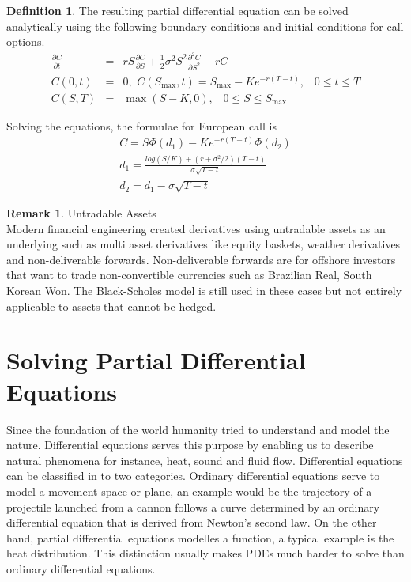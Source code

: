 \documentclass[12pt, oneside]{book}
\theoremstyle{plain}
\theoremstyle{definition}
\newtheorem{definition}[theorem]{Definition}
\newtheorem{remark}[theorem]{Remark}
\begin{document}
\begin{definition}\label{bsAnal} The resulting partial differential equation can be solved analytically using the following boundary conditions and initial conditions for call options.
\begin{eqnarray}
\frac{\partial C}{\partial t} &=& rS\frac{\partial C}{\partial S}+\frac{1}{2} \sigma^2 S^2 \frac{\partial^2 C}{\partial S^2} - rC \\[10pt]
C(0,t) &=& 0, \hspace{4pt} C(S_{\max},t)=S_{\max} - K e^{-r(T-t)}, \hspace{10pt} 0 \leq t \leq T \\[10pt]
C(S,T) &=& \max(S-K,0), \hspace{10pt} 0 \leq S \leq S_{\max}
\end{eqnarray}

Solving the equations, the formulae \cite{wilmott} for European call is
\begin{eqnarray}
C = S \Phi (d_1) - K e^{-r(T-t)} \Phi (d_2) \\[10pt]
d_1 = \frac{log(S/K) + (r + \sigma^2/2)(T - t)}{\sigma \sqrt{T-t}} \\[10pt]
d_2 = d_1 - \sigma \sqrt{T-t}
\end{eqnarray}

\end{definition}

\begin{remark}Untradable Assets\\ Modern financial engineering created derivatives using untradable assets as an underlying such as multi asset derivatives like equity baskets, weather derivatives and non-deliverable forwards. Non-deliverable forwards are for offshore investors that want to trade non-convertible currencies such as Brazilian Real, South Korean Won.  The Black-Scholes model is still used in these cases \cite{weather} \cite{basket} but not entirely applicable to assets that cannot be hedged.
\end{remark}


\section{Solving Partial Differential Equations}
Since the foundation of the world humanity tried to understand and model the nature. Differential equations serves this purpose by enabling us to describe natural phenomena for instance, heat, sound and fluid flow. 
Differential equations can be classified in to two categories. Ordinary differential equations serve to model a movement space or plane, an example would be the trajectory of a projectile launched from a cannon follows a curve determined by an ordinary differential equation that is derived from Newton's second law.
On the other hand, partial differential equations modelles a function, a typical example is the heat distribution. This distinction usually makes PDEs much harder to solve than ordinary differential equations.
\end{document}

